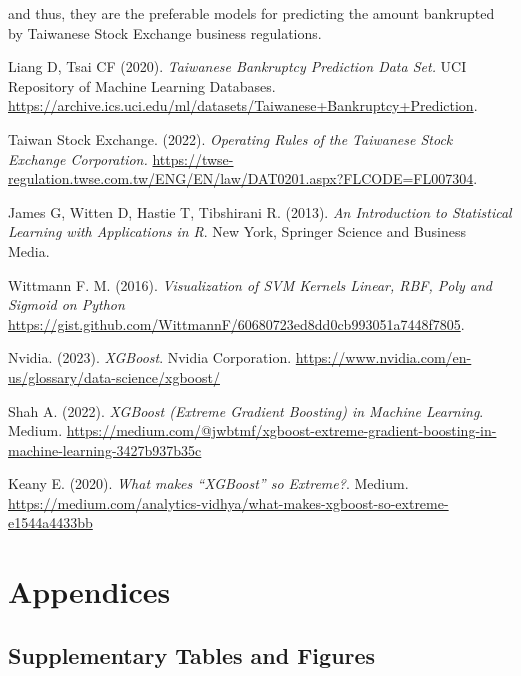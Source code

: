 \documentclass[12pt]{report}
\begin{document}
and thus, they are the preferable models for predicting the amount bankrupted by Taiwanese Stock Exchange business regulations.

\begin{thebibliography}{9}
Liang D, Tsai CF (2020). \textit{Taiwanese Bankruptcy Prediction Data Set.}
UCI Repository of Machine Learning Databases. \url{https://archive.ics.uci.edu/ml/datasets/Taiwanese+Bankruptcy+Prediction}.

Taiwan Stock Exchange. (2022). \textit{Operating Rules of the Taiwanese Stock Exchange Corporation.}
\url{https://twse-regulation.twse.com.tw/ENG/EN/law/DAT0201.aspx?FLCODE=FL007304}.

James G, Witten D, Hastie T, Tibshirani R. (2013). \textit{An Introduction to Statistical Learning with Applications in R}. New York, Springer Science and Business Media.

Wittmann F. M. (2016). \textit{Visualization of SVM Kernels Linear, RBF, Poly and Sigmoid on Python} \url{https://gist.github.com/WittmannF/60680723ed8dd0cb993051a7448f7805}.

Nvidia. (2023). \textit{XGBoost}. Nvidia Corporation. \url{https://www.nvidia.com/en-us/glossary/data-science/xgboost/}

Shah A. (2022). \textit{XGBoost (Extreme Gradient Boosting) in Machine Learning}. Medium. \url{https://medium.com/@jwbtmf/xgboost-extreme-gradient-boosting-in-machine-learning-3427b937b35c} 

Keany E. (2020). \textit{What makes “XGBoost” so Extreme?}. Medium. \url{https://medium.com/analytics-vidhya/what-makes-xgboost-so-extreme-e1544a4433bb} 

\end{thebibliography}

\chapter{Appendices}
\section{Supplementary Tables and Figures}
\end{document}
